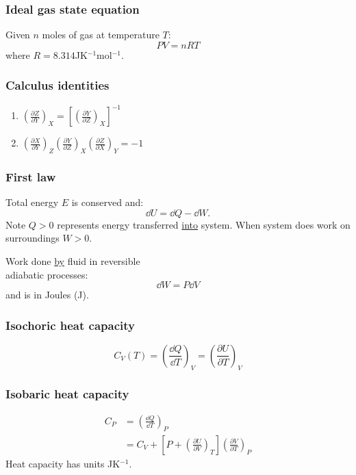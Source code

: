 \documentclass{article}
\begin{document}
\begin{multicols*}{3}
\subsubsection*{Ideal gas state equation}
Given $n$ moles of gas at temperature $T$:
$$PV=nRT$$
where $R=8.314$JK$^{-1}$mol$^{-1}$.

\subsubsection*{Calculus identities}
\begin{enumerate}
    \item $\displaystyle
    \left(\frac{\partial Z}{\partial Y}\right)_X
    =\left[\left(\frac{\partial Y}{\partial Z}\right)_X
    \right]^{-1}$

    \item $\displaystyle
    \left(\frac{\partial X}{\partial Y}\right)_Z
    \left(\frac{\partial Y}{\partial Z}\right)_X
    \left(\frac{\partial Z}{\partial X}\right)_Y
    =-1$
\end{enumerate}

\subsubsection*{First law}
Total energy $E$ is conserved and:
$$\dd U=\dd Q-\dd W.$$
Note $Q>0$ represents energy transferred
\underline{into} system.
When system does work on surroundings $W>0$.

Work done \underline{by} fluid
in reversible \\
adiabatic processes:
$$\dd W=P\dd V$$
and is in Joules (J).

\subsubsection*{Isochoric heat capacity}
$$C_V(T)=\left(\frac{\dd Q}{\dd T}\right)_V
=\left(\frac{\partial U}{\partial T}\right)_V$$

\subsubsection*{Isobaric heat capacity}
\begin{align*}
    C_P
    &=\left(\frac{\dd Q}{\dd T}\right)_P \\
    &=C_V+\left[P+
    \left(\frac{\partial U}{\partial V}\right)_T\right]
    \left(\frac{\partial V}{\partial T}\right)_P
\end{align*}
Heat capacity has units JK$^{-1}$.


\end{multicols*}
\end{document}
